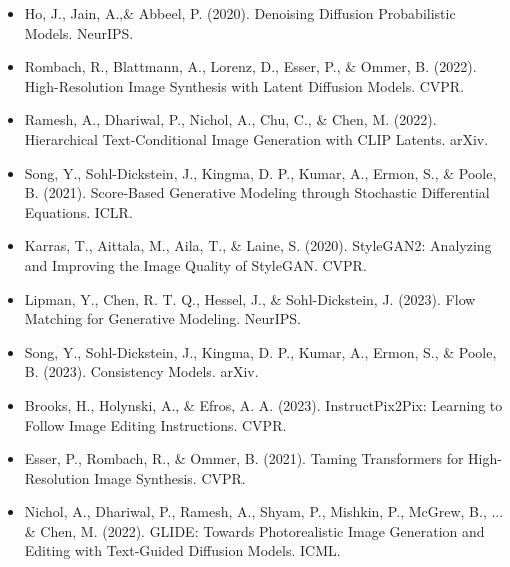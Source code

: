 \begin{itemize}
	\item Ho, J., Jain, A.,\& Abbeel, P. (2020). Denoising Diffusion Probabilistic Models. NeurIPS.
	\item Rombach, R., Blattmann, A., Lorenz, D., Esser, P., \& Ommer, B. (2022). High-Resolution Image Synthesis with Latent Diffusion Models. CVPR.
	\item Ramesh, A., Dhariwal, P., Nichol, A., Chu, C., \& Chen, M. (2022). Hierarchical Text-Conditional Image Generation with CLIP Latents. arXiv.
	\item Song, Y., Sohl-Dickstein, J., Kingma, D. P., Kumar, A., Ermon, S., \& Poole, B. (2021). Score-Based Generative Modeling through Stochastic Differential Equations. ICLR.
	\item Karras, T., Aittala, M., Aila, T., \& Laine, S. (2020). StyleGAN2: Analyzing and Improving the Image Quality of StyleGAN. CVPR.
	\item Lipman, Y., Chen, R. T. Q., Hessel, J., \& Sohl-Dickstein, J. (2023). Flow Matching for Generative Modeling. NeurIPS.
	\item Song, Y., Sohl-Dickstein, J., Kingma, D. P., Kumar, A., Ermon, S., \& Poole, B. (2023). Consistency Models. arXiv.
	\item Brooks, H., Holynski, A., \& Efros, A. A. (2023). InstructPix2Pix: Learning to Follow Image Editing Instructions. CVPR.
	\item Esser, P., Rombach, R., \& Ommer, B. (2021). Taming Transformers for High-Resolution Image Synthesis. CVPR.
	\item Nichol, A., Dhariwal, P., Ramesh, A., Shyam, P., Mishkin, P., McGrew, B., ... \& Chen, M. (2022). GLIDE: Towards Photorealistic Image Generation and Editing with Text-Guided Diffusion Models. ICML.
\end{itemize}



